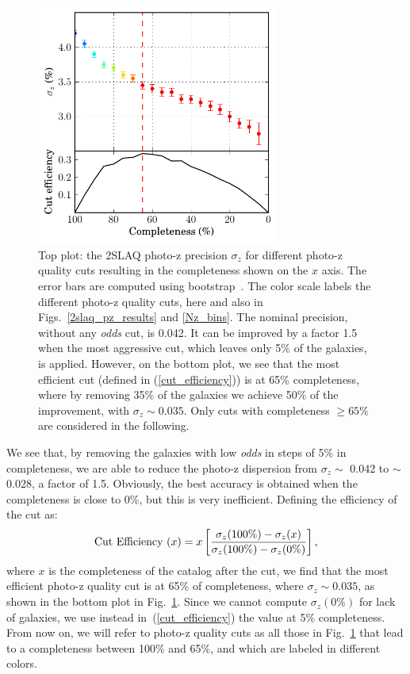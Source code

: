 \begin{figure}
\centering
\includegraphics[type=pdf,ext=.pdf,read=.pdf, width=80mm]{./plots/sigvseff}
\caption{Top plot: the 2SLAQ photo-z precision $\sigma_{z}$ for different photo-z quality cuts resulting in the completeness shown on the $x$ axis. The error bars are computed using bootstrap~\citep{efron79}. The color scale labels the different photo-z quality cuts, here and also in Figs.~\ref{2slaq_pz_results} and \ref{Nz_bins}. The nominal precision, without any \textit{odds} cut, is 0.042. It can be improved by a factor 1.5 when the most aggressive cut, which leaves only 5\% of the galaxies, is applied. However, on the bottom plot, we see that the most efficient cut (defined in (\ref{cut_efficiency})) is at 65\% completeness, where by removing 35\% of the galaxies we achieve 50\% of the improvement, with $\sigma_z\sim0.035$. Only cuts with completeness $\geq65\%$ are considered in the following.}
\label{sigvseff}
\end{figure}

We see that, by removing the galaxies with low \textit{odds} in steps of 5\% in completeness, we are able to reduce the photo-z dispersion from $\sigma_z \sim$ 0.042 to $\sim$0.028, a factor of 1.5. Obviously, the best accuracy is obtained when the completeness is close to 0\%, but this is very inefficient. Defining the efficiency of the cut as:
\begin{equation}
\text{Cut Efficiency } (x) = x \left[ {\sigma_z (100\%) - \sigma_z(x) \over \sigma_z (100\%) - \sigma_z(0\%)} \right],
\label{cut_efficiency}
\end{equation}
where $x$ is the completeness of the catalog after the cut, we find that the most efficient photo-z quality cut is at 65\% of completeness, where $\sigma_z \sim 0.035$, as shown in the bottom plot in Fig.~\ref{sigvseff}. Since we cannot compute $\sigma_z(0\%)$ for lack of galaxies, we use instead in~(\ref{cut_efficiency})
the value at 5\% completeness. From now on, we will refer to photo-z quality cuts as all those in Fig.~\ref{sigvseff} that lead to a completeness between 100\% and 65\%, and which are labeled in different colors.

